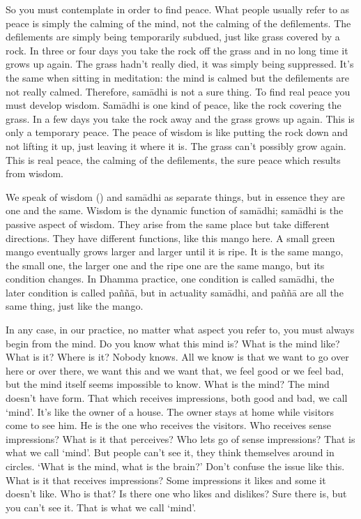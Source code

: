 So you must contemplate in order to find peace. What people usually refer to as peace is simply the calming of the mind, not the calming of the defilements. The defilements are simply being temporarily subdued, just like grass covered by a rock. In three or four days you take the rock off the grass and in no long time it grows up again. The grass hadn't really died, it was simply being suppressed. It's the same when sitting in meditation: the mind is calmed but the defilements are not really calmed. Therefore, sam\=adhi is not a sure thing. To find real peace you must develop wisdom. Sam\=adhi is one kind of peace, like the rock covering the grass. In a few days you take the rock away and the grass grows up again. This is only a temporary peace. The peace of wisdom is like putting the rock down and not lifting it up, just leaving it where it is. The grass can't possibly grow again. This is real peace, the calming of the defilements, the sure peace which results from wisdom.

We speak of wisdom () and sam\=adhi as separate things, but in essence they are one and the same. Wisdom is the dynamic function of sam\=adhi; sam\=adhi is the passive aspect of wisdom. They arise from the same place but take different directions. They have different functions, like this mango here. A small green mango eventually grows larger and larger until it is ripe. It is the same mango, the small one, the larger one and the ripe one are the same mango, but its condition changes. In Dhamma practice, one condition is called sam\=adhi, the later condition is called pa\~n\~n\=a, but in actuality  sam\=adhi, and pa\~n\~n\=a are all the same thing, just like the mango.

In any case, in our practice, no matter what aspect you refer to, you must always begin from the mind. Do you know what this mind is? What is the mind like? What is it? Where is it? Nobody knows. All we know is that we want to go over here or over there, we want this and we want that, we feel good or we feel bad, but the mind itself seems impossible to know. What is the mind? The mind doesn't have form. That which receives impressions, both good and bad, we call `mind'. It's like the owner of a house. The owner stays at home while visitors come to see him. He is the one who receives the visitors. Who receives sense impressions? What is it that perceives? Who lets go of sense impressions? That is what we call `mind'. But people can't see it, they think themselves around in circles. `What is the mind, what is the brain?' Don't confuse the issue like this. What is it that receives impressions? Some impressions it likes and some it doesn't like. Who is that? Is there one who likes and dislikes? Sure there is, but you can't see it. That is what we call `mind'.

